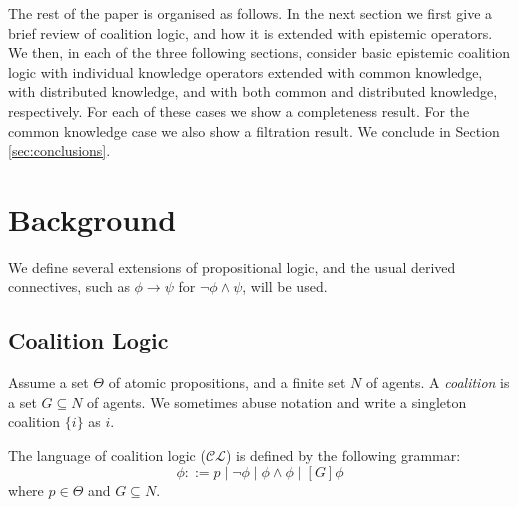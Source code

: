 \documentclass{article}
\newcommand{\acro}[1]{\ensuremath{\mathcal{#1}}}
\newcommand{\agents}{N}
\begin{document}
The rest of the paper is organised as follows. In the next section we
first give a brief review of coalition logic, and how it is extended
with epistemic operators. We then, in each of the three following
sections, consider basic epistemic coalition logic with individual
knowledge operators extended with common knowledge, with distributed
knowledge, and with both common and distributed knowledge,
respectively. For each of these cases we show a completeness
result. For the common knowledge case we also show a filtration
result. We conclude in Section \ref{sec:conclusions}.


\section{Background}

We define several extensions of propositional logic, and the usual
derived connectives, such as $\phi \rightarrow \psi$ for $\neg \phi
\wedge \psi$, will be used.

\subsection{Coalition Logic}

Assume a set $\Theta$ of atomic propositions, and a finite set
$\agents$ of agents. A \emph{coalition} is a set $G \subseteq \agents$
of agents. We sometimes abuse notation and write a singleton coalition
$\{i\}$ as $i$.

The language of coalition logic (\acro{CL}) is defined by the
following grammar:
\[\phi ::= p \mid \neg \phi \mid \phi \wedge \phi \mid [G]\phi\]
where $p \in \Theta$ and $G \subseteq \agents$.
\end{document}
